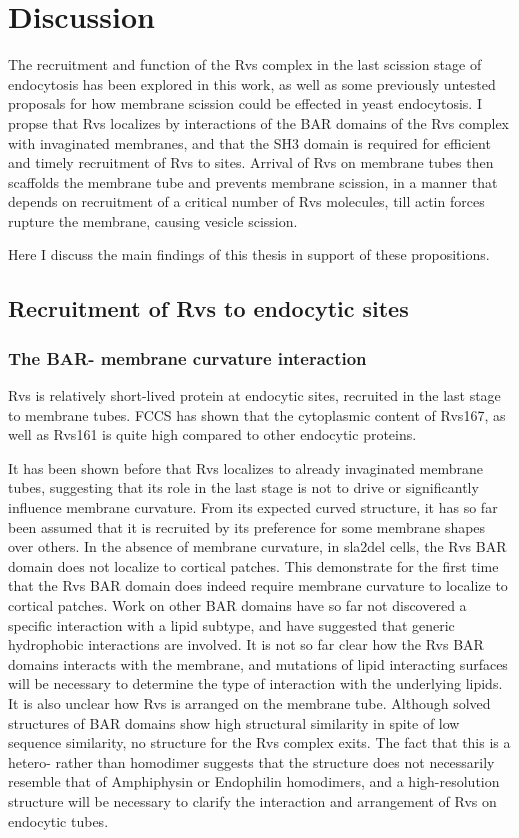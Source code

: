 
\chapter{Discussion}    
\label{Ch:discussion}
The recruitment and function of the Rvs complex in the last scission stage of endocytosis has been explored in this work, as well as some previously untested proposals for how membrane scission could be effected in yeast endocytosis. 
I propse that Rvs localizes by interactions of the BAR domains of the Rvs complex with invaginated membranes, and that the SH3 domain is required for efficient and timely recruitment of Rvs to sites. Arrival of Rvs on membrane tubes then scaffolds the membrane tube and prevents membrane scission, in a manner that depends on recruitment of a critical number of Rvs molecules, till actin forces rupture the membrane, causing vesicle scission. 

Here I discuss the main findings of this thesis in support of these propositions.

\section{Recruitment of Rvs to endocytic sites}

\subsection{The BAR- membrane curvature interaction}
Rvs is relatively short-lived protein at endocytic sites,  recruited in the last stage to membrane tubes. FCCS has shown that the cytoplasmic content of Rvs167, as well as Rvs161 is quite high compared to other endocytic proteins. 


It has been shown before that Rvs localizes to already invaginated membrane tubes, suggesting that its role in the last stage is not to drive or significantly influence membrane curvature. From its expected curved structure, it has so far been assumed that it is recruited by its preference for some membrane shapes over others. In the absence of membrane curvature, in sla2del cells, the Rvs BAR domain does not localize to cortical patches. This demonstrate for the first time that the Rvs BAR domain does indeed require membrane curvature to localize to cortical patches. Work on other BAR domains have so far not discovered a specific interaction with a lipid subtype, and have suggested that generic hydrophobic interactions are involved. It is not so far clear how the Rvs BAR domains interacts with the membrane, and mutations of lipid interacting surfaces will be necessary to determine the type of interaction with the underlying lipids. It is also unclear how Rvs is arranged on the membrane tube. Although solved structures of BAR domains show high structural similarity in spite of low sequence similarity, no structure for the Rvs complex exits. The fact that this is a hetero- rather than homodimer suggests that the structure does not necessarily resemble that of Amphiphysin or Endophilin homodimers, and a high-resolution structure will be necessary to clarify the interaction and arrangement of Rvs on endocytic tubes. 


